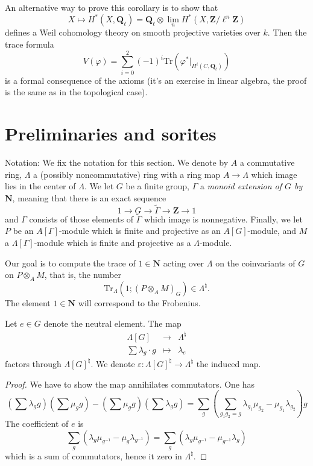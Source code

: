\noindent
An alternative way to prove this corollary is to show that
$$
X \mapsto H^* (X, \mathbf{Q}_\ell) =
\mathbf{Q}_\ell \otimes
\lim_n H^*(X, \mathbf{Z}/\ell^n\mathbf{Z})
$$
defines a Weil cohomology theory on smooth projective varieties over $k$. Then
the trace formula
$$
V(\varphi) = \sum_{i = 0}^2 (-1)^i
\text{Tr}(\varphi^* |_{H^i(C, \mathbf{Q}_\ell)})
$$
is a formal consequence of the axioms (it's an exercise in linear algebra, the
proof is the same as in the topological case).




\section{Preliminaries and sorites}
\label{section-preliminaries}

\noindent
Notation:
We fix the notation for this section. We denote by $A$ a commutative ring,
$\Lambda$ a (possibly noncommutative) ring with a ring map $A\to \Lambda$ which
image lies in the center of $\Lambda$. We let $G$ be a finite group, $\Gamma$ a
{\it monoid extension of $G$ by $\mathbf{N}$}, meaning that there is an exact
sequence
$$
1\to G\to \tilde\Gamma\to \mathbf{Z}\to 1
$$
and $\Gamma$ consists of those elements of $\tilde\Gamma$ which image is
nonnegative. Finally, we let $P$ be an $A[\Gamma]$-module which is finite and
projective as an $A[G]$-module, and $M$ a $\Lambda[\Gamma]$-module which is
finite and projective as a $\Lambda$-module.

\medskip\noindent
Our goal is to compute the trace of $1 \in \mathbf{N}$ acting over $\Lambda$
on the coinvariants of $G$ on $P \otimes_A M$, that is, the number
$$
\text{Tr}_{\Lambda}\left(1; \left(P \otimes_A M\right)_G\right) \in
\Lambda^\natural.
$$
The element $1\in \mathbf{N}$ will correspond to the Frobenius.

\begin{lemma}
\label{lemma-epsilon}
Let $e\in G$ denote the neutral element. The map
$$
\begin{matrix}
\Lambda[G] & \longrightarrow & \Lambda^{\natural}\\
\sum \lambda_g\cdot g & \longmapsto & \lambda_e
\end{matrix}
$$
factors through $\Lambda[G]^\natural$. We denote
$\varepsilon : \Lambda[G]^\natural\to \Lambda^\natural$ the induced map.
\end{lemma}

\begin{proof}
We have to show the map annihilates commutators. One has
$$
\left(\sum\lambda_g g\right)\left(\sum\mu_g g\right)-\left(\sum \mu_g
g\right)\left(\sum\lambda_g g\right)
= \sum_g\left(\sum_{g_1g_2=g}
\lambda_{g_1}\mu_{g_2}-\mu_{g_1}\lambda_{g_2}\right)g
$$
The coefficient of $e$ is
$$
\sum_g\left(\lambda_g\mu_{g^{-1}}-\mu_g\lambda_{g^{-1}}\right) =
\sum_g\left(\lambda_g\mu_{g^{-1}}-\mu_{g^{-1}}\lambda_g\right)
$$
which is a sum of commutators, hence it zero in $\Lambda^\natural$.
\end{proof}

